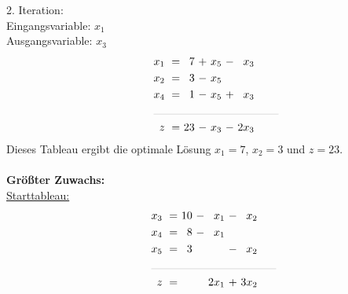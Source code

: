 \documentclass [a4paper,11pt]{article}
\begin{document}
\begin{enumerate}
\begin{enumerate}
\begin{enumerate}
                        2. Iteration:\\
                        Eingangsvariable: $x_1$\\
                        Ausgangsvariable: $x_3$
                        \begin{align*}
                        \begin{alignedat}{6}
                        && x_1 &\ = &\  7 &\ + &\  x_5 &\ - &\  x_3 \\
                        && x_2 &\ = &\  3 &\ - &\  x_5 &    &       \\
                        && x_4 &\ = &\  1 &\ - &\  x_5 &\ + &\  x_3 \\
                        &\rlap{\rule{4cm}{.1pt}} &&&&&&&\\
                        && z   &\ = &\ 23 &\ - &\  x_3 &\ - &\ 2x_3
                        \end{alignedat}
                        \end{align*}
                        Dieses Tableau ergibt die optimale Lösung $x_1 = 7$, $x_2 = 3$ und $z = 23$.\\ \\

                        \textbf{Größter Zuwachs:}\\
                        \underline{Starttableau:}
                        \begin{align*}
                        \begin{alignedat}{6}
                        && x_3 &\ = &\ 10 &\ - &\  x_1 &\ - &\  x_2 \\
                        && x_4 &\ = &\  8 &\ - &\  x_1 &    &       \\
                        && x_5 &\ = &\  3 &    &       &\ - &\  x_2 \\
                        &\rlap{\rule{4cm}{.1pt}} &&&&&&&\\
                        && z   &\ = &\    &    &\ 2x_1 &\ + &\ 3x_2
                        \end{alignedat}
                        \end{align*}


\end{enumerate}
\end{enumerate}
\end{enumerate}
\end{document}
